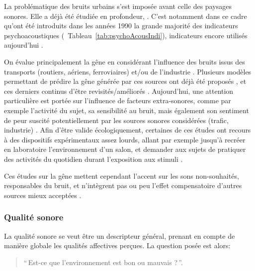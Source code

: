 La problématique des bruits urbains s'est imposée avant celle des paysages sonores. Elle a déjà été étudiée en profondeur, \citep{marquis2005noisea,marquis2005noiseb}. C'est notamment dans ce cadre qu'ont été introduits dans les années 1990 la grande majorité des indicateurs psychoacoustiques \citep{zwicker2013psychoacoustics}(\cf~Tableau~\ref{tab:psychoAcousIndi}), indicateurs encore utilisés aujourd'hui \citep{hall2013exploratory,fiebig2009psychoacoustic,yang2013psychoacoustical}.


On évalue principalement la gêne en considérant l'influence des bruits issus des transports (routiers, aériens, ferroviaires) et/ou de l'industrie  \citep{gille2016noise,gille2016dose,trolle2015perception,klein2015spectral}. Plusieurs modèles permettant de prédire la gêne générée par ces sources ont déjà été proposés \citep{miedema2001annoyance,miedema2004relationship}, et ces derniers continus d'être revisités/améliorés \citep{gille2016testing}. Aujourd'hui, une attention particulière est portée sur l'influence de facteurs extra-sonores, comme par exemple l'activité du sujet, sa sensibilité au bruit, mais également son sentiment de peur suscité potentiellement par les sources sonores considérées (trafic, industrie) \citep{marquis2015simulated,morel2016noise}. Afin d'être valide écologiquement, certaines de ces études ont recours à des dispositifs expérimentaux assez lourds, allant par exemple jusqu'à recréer en laboratoire l'environnement d'un salon, et demander aux sujets de pratiquer des activités du quotidien durant l'exposition aux stimuli \citep{marquis2015simulated}.

Ces études sur la gêne mettent cependant l'accent sur les sons non-souhaités, responsables du bruit, et n'intègrent pas ou peu l'effet compensatoire d'autres sources mieux acceptées \citep{aletta2016soundscape}.

\subsubsection{Qualité sonore}

La qualité sonore se veut être un descripteur général, prenant en compte de manière globale les qualités affectives perçues. La question posée est alors:

\begin{quote}
``\,Est-ce que l'environnement est bon ou mauvais ?\,''.
\end{quote}

